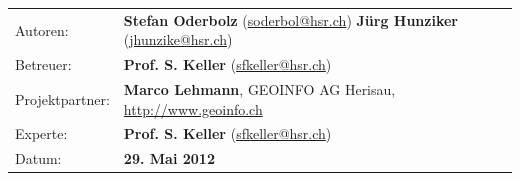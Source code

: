 \begin{titlepage}
\begin{tabular}{p{0.19\twocelltabwidth}p{0.81\twocelltabwidth}}
Autoren: & \textbf{Stefan Oderbolz} (\url{soderbol@hsr.ch}) \newline
 \textbf{Jürg Hunziker} (\url{jhunzike@hsr.ch}) \\ 
Betreuer: & \textbf{Prof. S. Keller} (\url{sfkeller@hsr.ch}) \\ 
Projektpartner: & \textbf{Marco Lehmann}, GEOINFO AG Herisau, \url{http://www.geoinfo.ch} \\ 
Experte: & \textbf{Prof. S. Keller} (\url{sfkeller@hsr.ch}) \\ 
Datum: & \textbf{29. Mai 2012} \\ 
\end{tabular}

\end{titlepage}